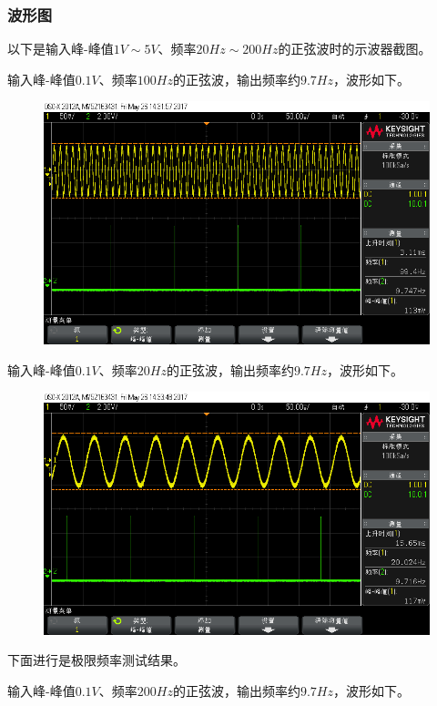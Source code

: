 \documentclass[12pt,a4paper]{article}
\begin{document}
\begin{spacing}{1.3}
\subsubsection{波形图}
以下是输入峰-峰值$1V\sim 5V$、频率$20Hz\sim 200Hz$的正弦波时的示波器截图。\par 
输入峰-峰值$0.1V、频率100Hz$的正弦波，输出频率约$9.7Hz$，波形如下。
\begin{figure}[H]
\centering
\includegraphics[width=\textwidth]{scope_2.png}
\end{figure}
输入峰-峰值$0.1V、频率20Hz的正弦波，输出频率约9.7Hz$，波形如下。
\begin{figure}[H]
\centering
\includegraphics[width=\textwidth]{scope_3.png}
\end{figure}
下面进行是极限频率测试结果。\par 
输入峰-峰值$0.1V、频率200Hz的正弦波，输出频率约9.7Hz$，波形如下。
\begin{figure}[H]
\centering

\end{figure}
\end{spacing}
\end{document}
